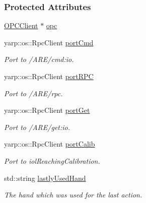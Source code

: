 \subsubsection*{Protected Attributes}
\begin{DoxyCompactItemize}
\item 
\hyperlink{group__icubclient__clients_classicubclient_1_1OPCClient}{O\+P\+C\+Client} $\ast$ \hyperlink{group__icubclient__subsystems_a2df4b6d0c2b2efbe83ab482e362a2755}{opc}
\item 
yarp\+::os\+::\+Rpc\+Client \hyperlink{group__icubclient__subsystems_a6871234a45e1bbbb474195d512fbd428}{port\+Cmd}
\begin{DoxyCompactList}\small\item\em Port to /\+A\+R\+E/cmd\+:io. \end{DoxyCompactList}\item 
yarp\+::os\+::\+Rpc\+Client \hyperlink{group__icubclient__subsystems_abbe5f0e2a29cd9d6cc907e8ef635b3a5}{port\+R\+PC}
\begin{DoxyCompactList}\small\item\em Port to /\+A\+R\+E/rpc. \end{DoxyCompactList}\item 
yarp\+::os\+::\+Rpc\+Client \hyperlink{group__icubclient__subsystems_a940b01fa144f15cdb9ef8200529e38f9}{port\+Get}
\begin{DoxyCompactList}\small\item\em Port to /\+A\+R\+E/get\+:io. \end{DoxyCompactList}\item 
yarp\+::os\+::\+Rpc\+Client \hyperlink{group__icubclient__subsystems_ab4c5eb79db5e71a74c9dba6d79249b44}{port\+Calib}
\begin{DoxyCompactList}\small\item\em Port to iol\+Reaching\+Calibration. \end{DoxyCompactList}\item 
std\+::string \hyperlink{group__icubclient__subsystems_a3c405216a4f5b0c19e497c37902f7f84}{lastly\+Used\+Hand}
\begin{DoxyCompactList}\small\item\em The hand which was used for the last action. \end{DoxyCompactList}\end{DoxyCompactItemize}


